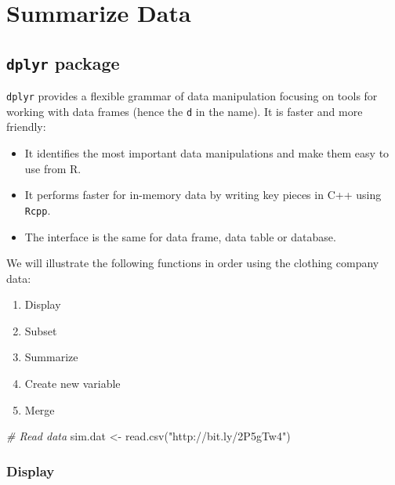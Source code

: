 \documentclass[
  12pt,
]{krantz}
\makeatletter
\newenvironment{Shaded}{\begin{snugshade}}{\end{snugshade}}
\newcommand{\CommentTok}[1]{\textcolor[rgb]{0.37,0.37,0.37}{\textit{#1}}}
\newcommand{\FunctionTok}[1]{\textcolor[rgb]{0,0,0}{#1}}
\newcommand{\NormalTok}[1]{#1}
\newcommand{\OtherTok}[1]{\textcolor[rgb]{0.37,0.37,0.37}{#1}}
\newcommand{\StringTok}[1]{\textcolor[rgb]{0.5,0.5,0.5}{#1}}
\providecommand{\tightlist}{%
  \setlength{\itemsep}{0pt}\setlength{\parskip}{0pt}}
\newenvironment{kframe}{%
\medskip{}
\setlength{\fboxsep}{.8em}
 \def\at@end@of@kframe{}%
 \ifinner\ifhmode%
  \def\at@end@of@kframe{\end{minipage}}%
  \begin{minipage}{\columnwidth}%
 \fi\fi%
 \def\FrameCommand##1{\hskip\@totalleftmargin \hskip-\fboxsep
 \colorbox{shadecolor}{##1}\hskip-\fboxsep
     \hskip-\linewidth \hskip-\@totalleftmargin \hskip\columnwidth}%
 \MakeFramed {\advance\hsize-\width
   \@totalleftmargin\z@ \linewidth\hsize
   \@setminipage}}%
 {\par\unskip\endMakeFramed%
 \at@end@of@kframe}
\renewenvironment{Shaded}{\begin{kframe}}{\end{kframe}}
\makeatother
\begin{document}
\hypertarget{summarize-data}{%
\section{Summarize Data}\label{summarize-data}}

\hypertarget{dplyr-package}{%
\subsection{\texorpdfstring{\texttt{dplyr} package}{dplyr package}}\label{dplyr-package}}

\texttt{dplyr} provides a flexible grammar of data manipulation focusing on tools for working with data frames (hence the \texttt{d} in the name). It is faster and more friendly:

\begin{itemize}
\tightlist
\item
  It identifies the most important data manipulations and make them easy to use from R.
\item
  It performs faster for in-memory data by writing key pieces in C++ using \texttt{Rcpp}.
\item
  The interface is the same for data frame, data table or database.
\end{itemize}

We will illustrate the following functions in order using the clothing company data:

\begin{enumerate}
\def\labelenumi{\arabic{enumi}.}
\tightlist
\item
  Display
\item
  Subset
\item
  Summarize
\item
  Create new variable
\item
  Merge
\end{enumerate}

\begin{Shaded}
\begin{Highlighting}[]
\CommentTok{\# Read data}
\NormalTok{sim.dat }\OtherTok{\textless{}{-}} \FunctionTok{read.csv}\NormalTok{(}\StringTok{"http://bit.ly/2P5gTw4"}\NormalTok{)}
\end{Highlighting}
\end{Shaded}

\hypertarget{display}{%
\subsubsection{Display}\label{display}}
\end{document}
